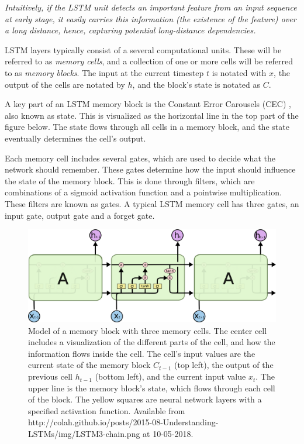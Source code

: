 \begin{displayquote}
    \textit{Intuitively, if the LSTM unit detects an important feature from an input sequence at early stage, it
    easily carries this information (the existence of the feature) over a long distance, hence, capturing
    potential long-distance dependencies.}
\end{displayquote}

LSTM layers typically consist of a several computational units. These will be referred to as \textit{memory cells}, and a collection of one or more cells will be referred to as \textit{memory blocks}. The input at the current timestep $t$ is notated with $x$, the output of the cells are notated by $h$, and the block's state is notated as $C$.

A key part of an LSTM memory block is the Constant Error Carousels (CEC) \cite{gers_learning_1999}, also known as state. This is visualized as the horizontal line in the top part of the figure below. The state flows through all cells in a memory block, and the state eventually determines the cell's output.

Each memory cell includes several gates, which are used to decide what the network should remember. These gates determine how the input should influence the state of the memory block. This is done through filters, which are combinations of a sigmoid activation function and a pointwise multiplication. These filters are known as gates. A typical LSTM memory cell has three gates, an input gate, output gate and a forget gate.

\begin{figure}[H]
    \centering
    \includegraphics[width=\textwidth]{Assets/Chapter2_Theory/LSTM3-chain.png}
    \caption{Model of a memory block with three memory cells. The center cell includes a visualization of the different parts of the cell, and how the information flows inside the cell. The cell's input values are the current state of the memory block $C_{t-1}$ (top left), the output of the previous cell $h_{t-1}$ (bottom left), and  the current input value $x_t$. The upper line is the memory block's state, which flows through each cell of the block. The yellow squares are neural network layers with a specified activation function. \cite{_understanding_2015} Available from http://colah.github.io/posts/2015-08-Understanding-LSTMs/img/LSTM3-chain.png at 10-05-2018.}
    \label{fig:lstm_cells}
\end{figure}

